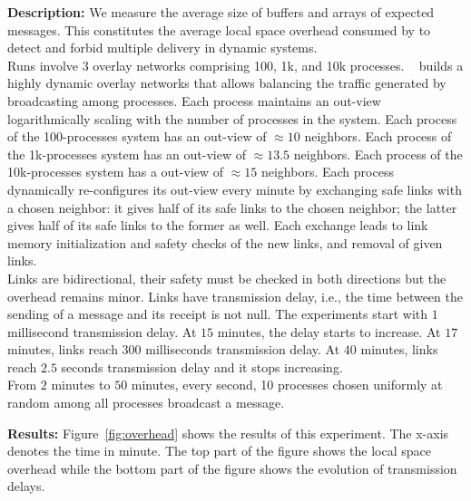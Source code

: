 \noindent \textbf{Description:} We measure the average size of buffers and
arrays of expected messages. This constitutes the average local space overhead
consumed by \RPCBROADCAST to detect and forbid multiple delivery in dynamic
systems.\\
Runs involve 3 overlay networks comprising 100, 1k, and 10k
processes. \SPRAY~\cite{nedelec2017adaptive} builds a highly dynamic overlay
networks that allows balancing the traffic generated by broadcasting among
processes. Each process maintains an out-view logarithmically scaling with the
number of processes in the system. Each process of the 100-processes system has
an out-view of $\approx 10$ neighbors. Each process of the 1k-processes system
has an out-view of $\approx 13.5$ neighbors. Each process of the 10k-processes
system has a out-view of $\approx 15$ neighbors. Each process dynamically
re-configures its out-view every minute by exchanging safe links with a chosen
neighbor: it gives half of its safe links to the chosen neighbor; the latter
gives half of its safe links to the former as well. Each exchange leads to link
memory initialization and safety checks of the new links,
and removal of given links.\\
Links are bidirectional, their safety must be checked in both directions but the
overhead remains minor. Links have transmission delay, i.e., the time between
the sending of a message and its receipt is not null. The experiments start with
$1$ millisecond transmission delay. At $15$ minutes, the delay starts to
increase. At $17$ minutes, links reach $300$ milliseconds transmission delay. At
$40$ minutes,
links reach $2.5$ seconds transmission delay and it stops increasing.\\
From $2$ minutes to $50$ minutes, every second, 10 processes chosen uniformly at
random among all processes broadcast a message.

\noindent \textbf{Results:} Figure~\ref{fig:overhead} shows the results of this
experiment. The x-axis denotes the time in minute. The top part of the figure
shows the local space overhead while the bottom part of the figure shows the
evolution of transmission delays.




